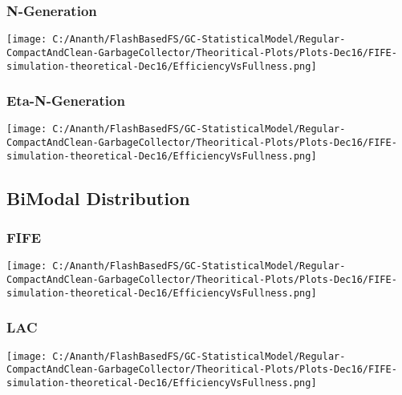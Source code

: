 \subsubsection{N-Generation}
\begin{SCfigure}
	\centering
	\texttt{[image: C:/Ananth/FlashBasedFS/GC-StatisticalModel/Regular-CompactAndClean-GarbageCollector/Theoritical-Plots/Plots-Dec16/FIFE-simulation-theoretical-Dec16/EfficiencyVsFullness.png]}
\end{SCfigure}

\subsubsection{Eta-N-Generation}
\begin{SCfigure}
	\centering
	\texttt{[image: C:/Ananth/FlashBasedFS/GC-StatisticalModel/Regular-CompactAndClean-GarbageCollector/Theoritical-Plots/Plots-Dec16/FIFE-simulation-theoretical-Dec16/EfficiencyVsFullness.png]}
\end{SCfigure}


\subsection{BiModal Distribution}

\subsubsection{FIFE}
\begin{SCfigure}
	\centering
	\texttt{[image: C:/Ananth/FlashBasedFS/GC-StatisticalModel/Regular-CompactAndClean-GarbageCollector/Theoritical-Plots/Plots-Dec16/FIFE-simulation-theoretical-Dec16/EfficiencyVsFullness.png]}
\end{SCfigure}

\subsubsection{LAC}
\begin{SCfigure}
	\centering
	\texttt{[image: C:/Ananth/FlashBasedFS/GC-StatisticalModel/Regular-CompactAndClean-GarbageCollector/Theoritical-Plots/Plots-Dec16/FIFE-simulation-theoretical-Dec16/EfficiencyVsFullness.png]}
\end{SCfigure}

